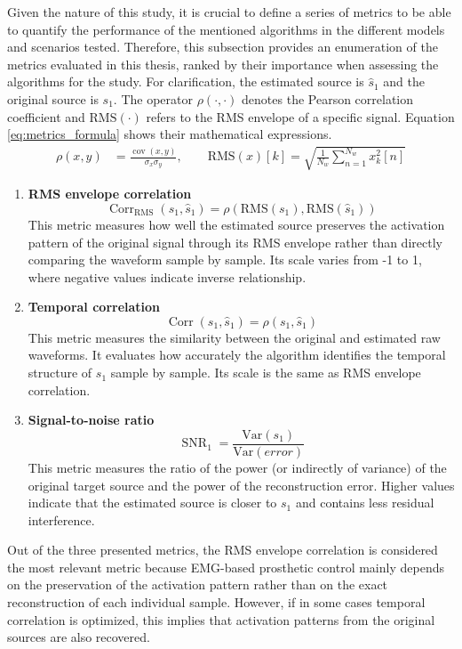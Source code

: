 Given the nature of this study, it is crucial to define a series of metrics to be able to quantify the performance of the mentioned algorithms in the different models and scenarios tested. Therefore, this subsection provides an enumeration of the metrics evaluated in this thesis, ranked by their importance when assessing the algorithms for the study. For clarification, the estimated source is $\hat{s}_1$ and the original source is $s_1$. 
The operator $\rho(\cdot,\cdot)$ denotes the Pearson correlation coefficient and $\mathrm{RMS}(\cdot)$ refers to the RMS envelope of a specific signal. Equation \ref{eq:metrics_formula} shows their mathematical expressions.
\begin{equation}
\begin{aligned}
\rho(x,y) &=
\frac{\operatorname{cov}(x,y)}
{\sigma_x \sigma_y}, \qquad
\mathrm{RMS}(x)[k] =
\sqrt{
\frac{1}{N_w}
\sum_{n=1}^{N_w} x_k^2[n]
}
\end{aligned}
\label{eq:metrics_formula}
\end{equation}

\begin{enumerate}
    \item \textbf{RMS envelope correlation}
    \[
    \operatorname{Corr}_{\mathrm{RMS}}(s_1,\hat{s}_1)
    =
    \rho\left(\mathrm{RMS}(s_1), \mathrm{RMS}(\hat{s}_1)\right)
    \]
This metric measures how well the estimated source preserves the activation pattern of the original signal through its RMS envelope rather than directly comparing the waveform sample by sample. Its scale varies from -1 to 1, where negative values indicate inverse relationship. 
\clearpage
    \item \textbf{Temporal correlation}
    \[
    \operatorname{Corr}(s_1,\hat{s}_1)
    =
    \rho(s_1,\hat{s}_1)
    \]
    This metric measures the similarity between the original and estimated raw waveforms. It evaluates how accurately the algorithm identifies the temporal structure of $s_1$ sample by sample. Its scale is the same as RMS envelope correlation.
    \item \textbf{Signal-to-noise ratio}
    \[
    \operatorname{SNR}_1 =\frac{\mathrm{Var}(s_1)}{\mathrm{Var}(error)}
    \]
    This metric measures the ratio of the power (or indirectly of variance) of the original target source and the power of the reconstruction error. Higher values indicate that the estimated source is closer to $s_1$ and contains less residual interference. 
\end{enumerate}

Out of the three presented metrics, the RMS envelope correlation is considered the most relevant metric because EMG-based prosthetic control mainly depends on the preservation of the activation pattern rather than on the exact reconstruction of each individual sample. However, if in some cases temporal correlation is optimized, this implies that activation patterns from the original sources are also recovered.
